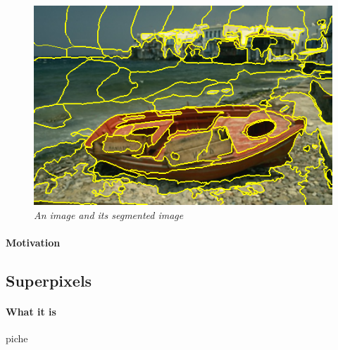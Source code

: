 \documentclass{article}
\begin{document}
            \begin{figure}[!ht]
                \centering
                \includegraphics[scale=0.5]{pics/img.png}
                \caption{\textit{An image and its segmented image}}
                \label{fig:segm}
            \end{figure}
            \paragraph{Motivation}

    \subsection{Superpixels}
            \paragraph{What it is}piche
\end{document}
